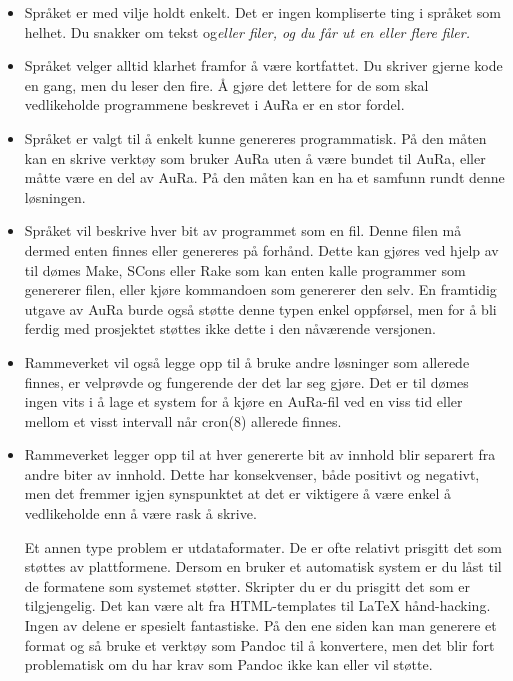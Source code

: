 \documentclass[11pt]{article}
\begin{document}
\begin{itemize}
\item Språket er med vilje holdt enkelt. Det er ingen kompliserte ting i språket som helhet. Du snakker om tekst og\textit{eller filer, og du får ut en eller flere filer.}
\item Språket velger alltid klarhet framfor å være kortfattet. Du skriver gjerne kode en gang, men du leser den fire. Å gjøre det lettere for de som skal vedlikeholde programmene beskrevet i AuRa er en stor fordel.
\item Språket er valgt til å enkelt kunne genereres programmatisk. På den måten kan en skrive verktøy som bruker AuRa uten å være bundet til AuRa, eller måtte være en del av AuRa. På den måten kan en ha et samfunn rundt denne løsningen.
\item Språket vil beskrive hver bit av programmet som en fil. Denne filen må dermed enten finnes eller genereres på forhånd. Dette kan gjøres ved hjelp av til dømes Make, SCons eller Rake som kan enten kalle programmer som genererer filen, eller kjøre kommandoen som genererer den selv. En framtidig utgave av AuRa burde også støtte denne typen enkel oppførsel, men for å bli ferdig med prosjektet støttes ikke dette i den nåværende versjonen.
\item Rammeverket vil også legge opp til å bruke andre løsninger som allerede finnes, er velprøvde og fungerende der det lar seg gjøre. Det er til dømes ingen vits i å lage et system for å kjøre en AuRa-fil ved en viss tid eller mellom et visst intervall når cron(8) allerede finnes.
\item Rammeverket legger opp til at hver genererte bit av innhold blir separert fra andre biter av innhold. Dette har konsekvenser, både positivt og negativt, men det fremmer igjen synspunktet at det er viktigere å være enkel å vedlikeholde enn å være rask å skrive.



Et annen type problem er utdataformater. De er ofte relativt prisgitt det som støttes av plattformene. Dersom en bruker et automatisk system er du låst til de formatene som systemet støtter. Skripter du er du prisgitt det som er tilgjengelig. Det kan være alt fra HTML-templates til LaTeX hånd-hacking. Ingen av delene er spesielt fantastiske. På den ene siden kan man generere et format og så bruke et verktøy som Pandoc til å konvertere, men det blir fort problematisk om du har krav som Pandoc ikke kan eller vil støtte.




\end{itemize}
\end{document}
